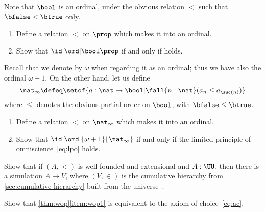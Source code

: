 \begin{ex}\label{ex:prop-ord}
  Note that $\bool$ is an ordinal, under the obvious relation $<$ such that $\bfalse<\btrue$ only.
  \begin{enumerate}
  \item Define a relation $<$ on $\prop$ which makes it into an ordinal.
  \item Show that $\id[\ord]\bool\prop$ if and only if \LEM{} holds.
  \end{enumerate}
\end{ex}

\begin{ex}\label{ex:ninf-ord}
  Recall that we denote \nat by $\omega$ when regarding it as an ordinal; thus we have also the ordinal $\omega+1$.
  On the other hand, let us define
  \[ \nat_\infty \defeq \setof{a:\nat\to\bool | \fall{n:\nat} (a_n \le a_{\suc(n)}) } \]
  where $\le$ denotes the obvious partial order on $\bool$, with $\bfalse\le\btrue$.
  \begin{enumerate}
  \item Define a relation $<$ on $\nat_\infty$ which makes it into an ordinal.
  \item Show that $\id[\ord]{\omega+1}{\nat_\infty}$ if and only if the limited principle of omniscience~\eqref{eq:lpo} holds.%
  \end{enumerate}
\end{ex}

\begin{ex}\label{ex:well-founded-extensional-simulation}
  Show that if $(A,<)$ is well-founded and extensional and $A:\UU$, then there is a simulation $A\to V$, where $(V,\in)$ is the cumulative hierarchy from \cref{sec:cumulative-hierarchy} built from the universe~\UU.
\end{ex}

\begin{ex}\label{ex:choice-function}
  Show that \cref{thm:wop}\ref{item:wop1} is equivalent to the axiom of choice~\eqref{eq:ac}.
\end{ex}

